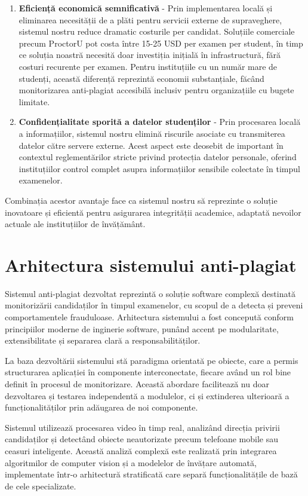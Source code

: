\documentclass[12pt,a4paper]{article}
\begin{document}
\begin{enumerate}
    \item \textbf{Eficiență economică semnificativă} - Prin implementarea locală și eliminarea necesității de a plăti pentru servicii externe de supraveghere, sistemul nostru reduce dramatic costurile per candidat. Soluțiile comerciale precum ProctorU pot costa între 15-25 USD per examen per student, în timp ce soluția noastră necesită doar investiția inițială în infrastructură, fără costuri recurente per examen. Pentru instituțiile cu un număr mare de studenți, această diferență reprezintă economii substanțiale, făcând monitorizarea anti-plagiat accesibilă inclusiv pentru organizațiile cu bugete limitate.
    
    \item \textbf{Confidențialitate sporită a datelor studenților} - Prin procesarea locală a informațiilor, sistemul nostru elimină riscurile asociate cu transmiterea datelor către servere externe. Acest aspect este deosebit de important în contextul reglementărilor stricte privind protecția datelor personale, oferind instituțiilor control complet asupra informațiilor sensibile colectate în timpul examenelor.
\end{enumerate}

Combinația acestor avantaje face ca sistemul nostru să reprezinte o soluție inovatoare și eficientă pentru asigurarea integrității academice, adaptată nevoilor actuale ale instituțiilor de învățământ.

\section{Arhitectura sistemului anti-plagiat}

Sistemul anti-plagiat dezvoltat reprezintă o soluție software complexă destinată monitorizării candidaților în timpul examenelor, cu scopul de a detecta și preveni comportamentele frauduloase. Arhitectura sistemului a fost concepută conform principiilor moderne de inginerie software, punând accent pe modularitate, extensibilitate și separarea clară a responsabilităților.

La baza dezvoltării sistemului stă paradigma orientată pe obiecte, care a permis structurarea aplicației în componente interconectate, fiecare având un rol bine definit în procesul de monitorizare. Această abordare facilitează nu doar dezvoltarea și testarea independentă a modulelor, ci și extinderea ulterioară a funcționalităților prin adăugarea de noi componente.

Sistemul utilizează procesarea video în timp real, analizând direcția privirii candidaților și detectând obiecte neautorizate precum telefoane mobile sau ceasuri inteligente. Această analiză complexă este realizată prin integrarea algoritmilor de computer vision și a modelelor de învățare automată, implementate într-o arhitectură stratificată care separă funcționalitățile de bază de cele specializate.
\end{document}
